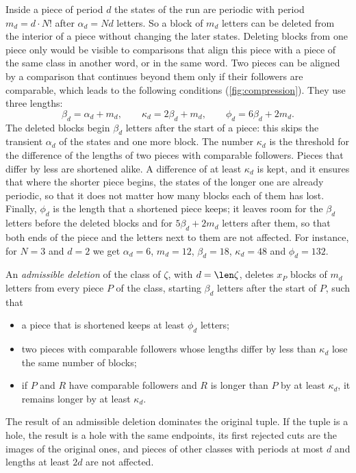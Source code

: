 Inside a piece of period $d$ the states of the run are periodic with period
$m_d=d\cdot N!$ after $\alpha_d=Nd$ letters. So a block of $m_d$ letters
can be deleted from the interior of a piece without changing the later
states. Deleting blocks from one piece only would be visible to
comparisons that align this piece with a piece of the same class in another
word, or in the same word. Two pieces can be aligned by a comparison that
continues beyond them only if their followers are comparable, which leads to
the following conditions (\cref{fig:compression}). They use three lengths:
\[
  \beta_d=\alpha_d+m_d,\qquad\kappa_d=2\beta_d+m_d,\qquad
  \phi_d=6\beta_d+2m_d.
\]
The deleted blocks begin $\beta_d$ letters after the start of a piece: this
skips the transient $\alpha_d$ of the states and one more block. The number
$\kappa_d$ is the threshold for the difference of the lengths of two pieces
with comparable followers. Pieces that differ by less are shortened alike.
A difference of at least $\kappa_d$ is kept, and it ensures that where the
shorter piece begins, the states of the longer one are already periodic, so
that it does not matter how many blocks each of them has lost. Finally,
$\phi_d$ is the length that a shortened piece keeps; it leaves room for the
$\beta_d$ letters before the deleted blocks and for $5\beta_d+2m_d$ letters
after them, so that both ends of the piece and the letters next to them are
not affected. For instance, for $N=3$ and $d=2$ we get $\alpha_d=6$,
$m_d=12$, $\beta_d=18$, $\kappa_d=48$ and $\phi_d=132$.

\begin{definition}\label{def:admissible}
An \emph{admissible deletion} of the class of $\zeta$, with $d=\len\zeta$,
deletes $x_P$ blocks of $m_d$ letters from every piece $P$ of the class,
starting $\beta_d$ letters after the start of $P$, such that
\begin{itemize}
\item a piece that is shortened keeps at least $\phi_d$ letters;
\item two pieces with comparable followers whose lengths differ by less
  than $\kappa_d$ lose the same number of blocks;
\item if $P$ and $R$ have comparable followers and $R$ is longer than $P$
  by at least $\kappa_d$, it remains longer by at least $\kappa_d$.
\end{itemize}
\end{definition}

\begin{lemma}\label{lem:admissible}
The result of an admissible deletion dominates the original tuple. If the
tuple is a hole, the result is a hole with the same endpoints, its first
rejected cuts are the images of the original ones, and pieces of other
classes with periods at most $d$ and lengths at least $2d$ are not affected.
\end{lemma}

